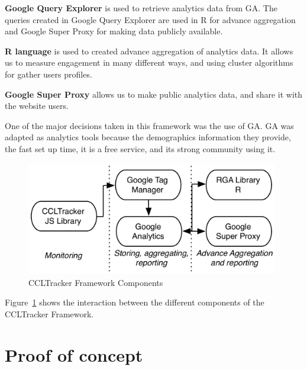 \documentclass{article}
\begin{document}
\textbf{Google Query Explorer} is used to retrieve analytics data from GA. The queries created in Google Query Explorer are used in R for advance aggregation and Google Super Proxy for making data publicly available. 

\textbf{R language} is used to created advance aggregation of analytics data. It allows us to measure engagement in many different ways, and using cluster algorithms for gather users profiles. 

\textbf{Google Super Proxy} allows us to make public analytics data, and share it with the website users. 


One of the major decisions taken in this framework was the use of GA. GA was adapted as analytics tools because the demographics information they provide, the fast set up time, it is a free service, and its strong community using it. 



\begin{figure}[t]
  \begin{center}
		\includegraphics[width=11cm]{imgs/ccltrackerFramework.pdf}
  \end{center}
\caption{CCLTracker Framework Components}
\label{img:CCLTrackerFrameworkComponents}
\end{figure}

Figure~\ref{img:CCLTrackerFrameworkComponents} shows the interaction between the different components of the CCLTracker Framework. 




\section{Proof of concept}
\end{document}
